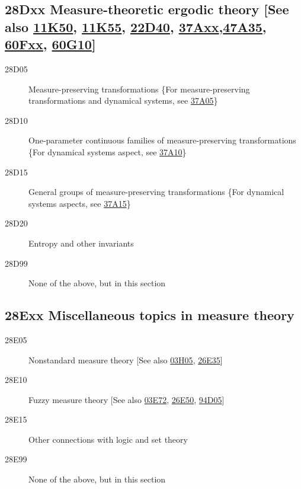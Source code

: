 \subsection*{28Dxx  Measure-theoretic ergodic theory [See also \hyperref[11K50]{11K50}, \hyperref[11K55]{11K55}, \hyperref[22D40]{22D40}, \hyperref[37Axx]{37Axx},\newline \hyperref[47A35]{47A35}, \hyperref[60Fxx]{60Fxx}, \hyperref[60G10]{60G10}] }\label{28Dxx}
\begin{description}  
\item [28D05]\label{28D05} Measure-preserving transformations \{For measure-preserving transformations and dynamical systems, see \hyperref[37A05]{37A05}\}
\item [28D10]\label{28D10} One-parameter continuous families of measure-preserving transformations \{For dynamical systems aspect, see \hyperref[37A10]{37A10}\}
\item [28D15]\label{28D15} General groups of measure-preserving transformations \{For dynamical systems aspects, see \hyperref[37A15]{37A15}\} 
\item [28D20]\label{28D20} Entropy and other invariants
\item [28D99]\label{28D99} None of the above, but in this section
\end{description}
\subsection*{28Exx  Miscellaneous topics in measure theory }\label{28Exx}
\begin{description}  
\item [28E05]\label{28E05} Nonstandard measure theory [See also \hyperref[03H05]{03H05}, \hyperref[26E35]{26E35}]
\item [28E10]\label{28E10} Fuzzy measure theory [See also \hyperref[03E72]{03E72}, \hyperref[26E50]{26E50}, \hyperref[94D05]{94D05}]
\item [28E15]\label{28E15} Other connections with logic and set theory
\item [28E99]\label{28E99} None of the above, but in this section
\end{description}
